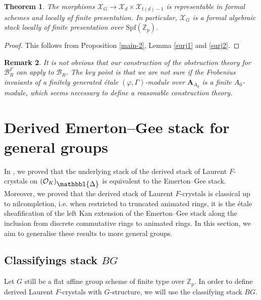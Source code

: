 \documentclass[10pt]{article}
\newtheorem{thm}{Theorem}[section]
\newtheorem{rmk}[thm]{Remark}
\numberwithin{equation}{section}
\newcommand{\bZ}{{\mathbb Z}}
\newcommand{\calB}{{\mathcal B}}
\newcommand{\calO}{{\mathcal O}}
\newcommand{\calX}{{\mathcal X}}
\newcommand{\Spf}{{\mathrm{Spf}}}           %
\newcommand{\bfA}{{\textbf{A}}}
\newcommand{\Prism}{{\mathlarger{\mathbbl{\Delta}}}} %
\begin{document}
\begin{thm}\label{main-1}
    The morphisms  $\calX_G\to \calX_{d}\times \calX_{t(d)-1}$ is representable in formal schemes and locally of finite presentation. In particular, $\calX_G$ is a formal algebraic stack locally of finite presentation over $\Spf(\bZ_p)$.
\end{thm}
\begin{proof}
    This follows from Proposition \ref{main-2}, Lemma \ref{surj1} and \ref{surj2}.
\end{proof}

\begin{rmk}
   It is not obvious that our construction of the obstruction theory for $\calB_R^{\Gamma}$ can apply to $\calB_R$. The key point is that we are not sure if the Frobenius invaiants of a finitely generated \'etale $(\varphi,\Gamma)$-module over $\bfA_{A_0}$ is a finite $A_0$-module, which seems necessary to define a reasonable construction theory.
\end{rmk}


\section{Derived Emerton--Gee stack for general groups}

In \cite{Min23}, we proved that the underlying stack of the derived stack of Laurent $F$-crystals on $(\calO_K)_{\Prism}$ is equivalent to the Emerton--Gee stack. Moreover, we proved that the derived stack of Laurent $F$-crystals is classical up to nilcompletion, i.e. when restricted to truncated animated rings, it is the \'etale sheafification of the left Kan extension of the Emerton--Gee stack along the inclusion from discrete commutative rings to animated rings. In this section, we aim to generalise these results to more general groups. 

\subsection{Classifyings stack $BG$}
Let $G$ still be a flat affine group scheme of finite type over $\bZ_p$. In order to define derived Laurent $F$-crystals with $G$-structure, we will use the classifying stack $BG$. 
\end{document}
